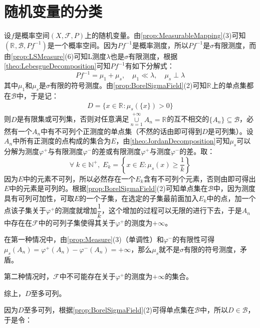 \section{随机变量的分类}

设$f$是概率空间$(X,\mathscr{F},P)$上的随机变量。由\cref{prop:MeasurableMapping}(3)可知$(\mathbb{R}^{},\mathcal{B},Pf^{-1})$是一个概率空间。因为$Pf^{-1}$是概率测度，所以$Pf^{-1}$是$\sigma$有限测度，而由\cref{prop:LSMeasure}(6)可知L测度$\lambda$也是$\sigma$有限测度，根据\cref{theo:LebesgueDecomposition}可知$Pf^{-1}$有如下分解式：
\begin{equation*}
	Pf^{-1}=\mu_1+\mu_s,\quad\mu_1\ll\lambda,\quad\mu_s\perp\lambda
\end{equation*}
其中$\mu_1$和$\mu_s$是$\sigma$有限的符号测度。由\cref{prop:BorelSigmaField}(2)可知$\mathbb{R}^{}$上的单点集都在$\mathcal{B}$中，于是记：
\begin{gather*}
	D=\{x\in\mathbb{R}^{}:\mu_s(\{x\})>0\}
\end{gather*}
则$D$是有限集或可列集，否则对任意满足$\underset{n=1}{\overset{+\infty}{\cup}}A_n=\mathbb{R}^{}$的互不相交的$\{A_n\}\subseteq\mathcal{B}$，必然有一个$A_n$中有不可列个正测度的单点集（不然的话由即可得到$D$是可列集）。设$A_n$中所有正测度的点构成的集合为$E$，由\cref{theo:JordanDecomposition}可知$\mu_s$可以分解为测度$\varphi^+$与有限测度$\varphi^-$的差或有限测度$\varphi^+$与测度$\varphi^-$的差。取：
\begin{equation*}
	\forall\;k\in\mathbb{N}^+,\;E_k=\left\{x\in E:\mu_s(x)\geqslant\frac{1}{k}\right\}
\end{equation*}
因为$E$中的元素不可列，所以必然存在一个$E_k$含有不可列个元素，否则由即可得出$E$中的元素是可列的。根据\cref{prop:BorelSigmaField}(2)可知单点集在$\mathcal{B}$中，因为测度具有可列可加性，可取$E$的一个子集，在选定的子集最前面加入$E_k$中的点，加一个点该子集关于$\varphi^+$的测度就增加$\dfrac{1}{k}$，这个增加的过程可以无限的进行下去，于是$A_n$中存在在$\mathscr{F}$中的可列子集使得其关于$\varphi^+$的测度为$+\infty$。\par
在第一种情况中，由\cref{prop:Measure}(3)（单调性）和$\varphi^-$的有限性可得$\mu_s(A_n)=\varphi^+(A_n)-\varphi^-(A_n)=+\infty$，那么$\mu_s$就不是$\sigma$有限的符号测度，矛盾。\par
第二种情况时，$\mathscr{F}$中不可能存在关于$\varphi^+$的测度为$+\infty$的集合。\par
综上，$D$至多可列。\par
因为$D$至多可列，根据\cref{prop:BorelSigmaField}(2)可得单点集在$\mathcal{B}$中，所以$D\in\mathcal{B}$，于是令：

